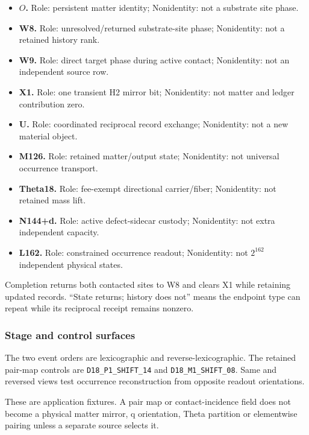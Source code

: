 \begin{itemize}
\tightlist
\item
  \textbf{\(O\).} Role: persistent matter identity; Nonidentity: not a
  substrate site phase.
\item
  \textbf{W8.} Role: unresolved/returned substrate-site phase;
  Nonidentity: not a retained history rank.
\item
  \textbf{W9.} Role: direct target phase during active contact;
  Nonidentity: not an independent source row.
\item
  \textbf{X1.} Role: one transient H2 mirror bit; Nonidentity: not
  matter and ledger contribution zero.
\item
  \textbf{U.} Role: coordinated reciprocal record exchange; Nonidentity:
  not a new material object.
\item
  \textbf{M126.} Role: retained matter/output state; Nonidentity: not
  universal occurrence transport.
\item
  \textbf{Theta18.} Role: fee-exempt directional carrier/fiber;
  Nonidentity: not retained mass lift.
\item
  \textbf{N144+d.} Role: active defect-sidecar custody; Nonidentity: not
  extra independent capacity.
\item
  \textbf{L162.} Role: constrained occurrence readout; Nonidentity: not
  \(2^{162}\) independent physical states.
\end{itemize}

Completion returns both contacted sites to W8 and clears X1 while
retaining updated records. ``State returns; history does not'' means the
endpoint type can repeat while its reciprocal receipt remains nonzero.

\subsubsection{Stage and control
surfaces}\label{viii-ch08-stage-and-control-surfaces}

The two event orders are lexicographic and reverse-lexicographic. The
retained pair-map controls are \texttt{D18\_\nolinkurl{P1_SHIFT_1}4} and
\texttt{D18\_\nolinkurl{M1_SHIFT_0}8}. Same and reversed views test occurrence
reconstruction from opposite readout orientations.

These are application fixtures. A pair map or contact-incidence field
does not become a physical matter mirror, q orientation, Theta partition
or elementwise pairing unless a separate source selects it.

